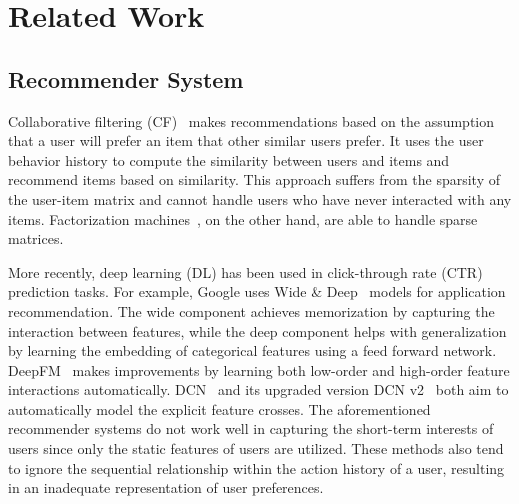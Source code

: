 \section{Related Work}
\label{sec:related_work}


\subsection{Recommender System}
Collaborative filtering (CF)~\cite{sarwar2001item, CF, CF2} makes recommendations based on the assumption that a user will prefer an item that other similar users prefer. 
It uses the user behavior history to compute the similarity between users and items and recommend items based on similarity. 
This approach suffers from the sparsity of the user-item matrix and cannot handle users who have never interacted with any items. 
Factorization machines~\cite{FM, rendle2010factorization}, on the other hand, are able to handle sparse matrices.

More recently, deep learning (DL) has been used in click-through rate (CTR) prediction tasks. 
For example, Google uses Wide \& Deep~\cite{cheng2016wide} models for application recommendation. 
The wide component achieves memorization by capturing the interaction between features, while the deep component helps with generalization by learning the embedding of categorical features using a feed forward network.
DeepFM~\cite{guo2017deepfm} makes improvements by learning both low-order and high-order feature interactions automatically. 
DCN~\cite{dcn} and its upgraded version DCN v2~\cite{DCNv2} both aim to automatically model the explicit feature crosses.
The aforementioned recommender systems do not work well in capturing the short-term interests of users since only the static features of users are utilized. 
These methods also tend to ignore the sequential relationship within the action history of a user, resulting in an inadequate representation of user preferences. 

